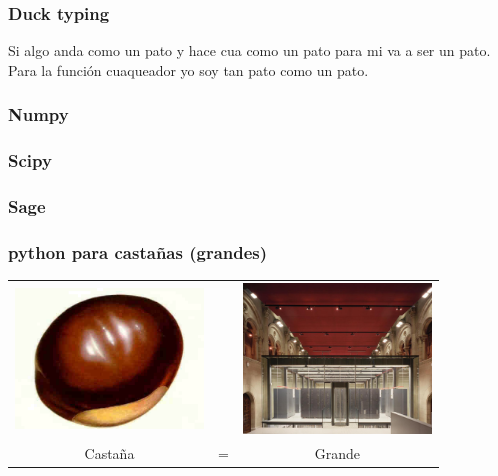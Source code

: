 \documentclass{beamer}
\begin{document}
\begin{frame}
\frametitle{Duck typing}
\testcode

Si algo anda como un pato y hace cua como un pato para mi va a ser un pato.
Para la función cuaqueador yo soy tan pato como un pato.
\end{frame}


\begin{frame}
  \frametitle{Numpy}
  
\end{frame}

\begin{frame}
  \frametitle{Scipy}
  
\end{frame}


\begin{frame}
  \frametitle{Sage}
  
\end{frame}


\begin{frame}
 \frametitle{python para castañas (grandes)}
  \begin{center}
 \begin{tabular}[h]{ccc}
   \includegraphics[width=5cm]{files/castana.jpg}& &
   \includegraphics[width=5cm]{files/marenostrum.jpg}\\
   Castaña & = & Grande
 \end{tabular}
\end{center}
\end{frame}
\end{document}
